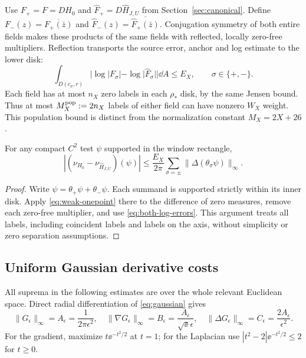 Use $F_+=F=D H_0$ and $\widehat F_+=D\widehat H_{J,U}$ from
Section~\ref{sec:canonical}. Define
$F_-(z)=\overline{F_+(\bar z)}$ and
$\widehat F_-(z)=\overline{\widehat F_+(\bar z)}$.
Conjugation symmetry of both entire fields makes these products of the
same fields with reflected, locally zero-free multipliers. Reflection
transports the source error, anchor and log estimate to the lower disk:
\begin{equation}\label{eq:both-log-errors}
 \int_{D(c_\sigma,r)}
       |\log|F_\sigma|-\log|\widehat F_\sigma||\dd A\le E_X,
 \qquad \sigma\in\{+,-\}.
\end{equation}
Each field has at most $n_X$ zero labels in each $\rho_*$ disk, by
the same Jensen bound. Thus at most $M_X^{\rm pop}:=2n_X$ labels
of either field can have nonzero $W_X$ weight. This population bound
is distinct from the normalization constant $M_X=2X+26$.

\begin{lemma}\label{lem:two-sided}
For any compact $C^2$ test $\psi$ supported in the window rectangle,
\begin{equation}\label{eq:two-sided-transfer}
 \left|(\nu_{H_0}-\nu_{\widehat H_{J,U}})(\psi)\right|
 \le\frac{E_X}{2\pi}
       \sum_{\sigma=\pm}\|\Delta(\theta_\sigma\psi)\|_\infty.
\end{equation}
\end{lemma}
\begin{proof}
Write $\psi=\theta_+\psi+\theta_-\psi$. Each summand is supported
strictly within its inner disk. Apply \eqref{eq:weak-onepoint} there
to the difference of zero measures, remove each zero-free multiplier,
and use \eqref{eq:both-log-errors}. This argument treats all labels,
including coincident labels and labels on the axis, without simplicity
or zero separation assumptions.
\end{proof}

\subsection{Uniform Gaussian derivative costs}

All suprema in the following estimates are over the whole relevant
Euclidean space. Direct radial differentiation of \eqref{eq:gaussian}
gives
\begin{equation}\label{eq:gaussian-costs}
 \|G_\epsilon\|_\infty=A_\epsilon=\frac1{2\pi\epsilon^2},\quad
 \|\nabla G_\epsilon\|_\infty=B_\epsilon
       =\frac{A_\epsilon}{\sqrt{\ee}\epsilon},\quad
 \|\Delta G_\epsilon\|_\infty=C_\epsilon
       =\frac{2A_\epsilon}{\epsilon^2}.
\end{equation}
For the gradient, maximize $t\ee^{-t^2/2}$ at $t=1$; for the
Laplacian use $|t^2-2|\ee^{-t^2/2}\le2$ for $t\ge0$.

